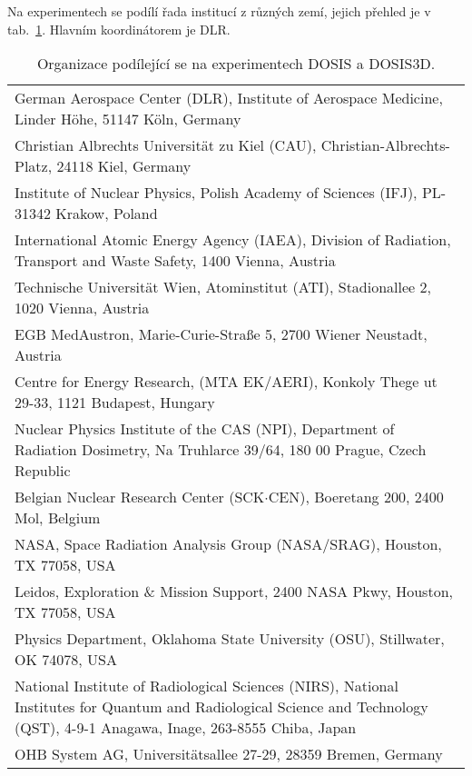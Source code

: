 Na experimentech se podílí řada institucí z různých zemí, jejich přehled je v tab.~\ref{tab:dosis_instituce}. Hlavním koordinátorem je DLR. 
\begin{table}[H]
  \centering
\renewcommand{\baselinestretch}{0.8}
\renewcommand{\arraystretch}{2}
\footnotesize
\caption{Organizace podílející se na experimentech DOSIS a DOSIS3D. \cite{dosis}}
  \label{tab:dosis_instituce}
  \begin{tabularx}{\textwidth}{X}
	\toprule
German Aerospace Center (DLR), Institute of Aerospace Medicine, Linder Höhe, 51147 Köln, Germany\\
Christian Albrechts Universität zu Kiel (CAU), Christian-Albrechts-Platz, 24118 Kiel, Germany                                    \\
Institute of Nuclear Physics, Polish Academy of Sciences (IFJ), PL-31342 Krakow, Poland                                          \\
International Atomic Energy Agency (IAEA), Division of Radiation, Transport and Waste Safety, 1400 Vienna, Austria               \\
Technische Universität Wien, Atominstitut (ATI), Stadionallee 2, 1020 Vienna, Austria                                            \\
EGB MedAustron, Marie-Curie-Straße 5, 2700 Wiener Neustadt, Austria                                                              \\
Centre for Energy Research, (MTA EK/AERI), Konkoly Thege ut 29-33, 1121 Budapest, Hungary                                             \\
Nuclear Physics Institute of the CAS (NPI), Department of Radiation Dosimetry, Na Truhlarce 39/64, 180 00 Prague, Czech Republic \\
Belgian Nuclear Research Center (SCK$\cdot$CEN), Boeretang 200, 2400 Mol, Belgium    \\
NASA, Space Radiation Analysis Group (NASA/SRAG), Houston, TX 77058, USA       \\
Leidos, Exploration \& Mission Support, 2400 NASA Pkwy, Houston, TX 77058, USA  \\
Physics Department, Oklahoma State University (OSU), Stillwater, OK 74078, USA \\
National Institute of Radiological Sciences (NIRS), National Institutes for Quantum and Radiological Science and Technology (QST), 4-9-1 Anagawa, Inage, 263-8555 Chiba, Japan\\
OHB System AG, Universitätsallee 27-29, 28359 Bremen, Germany\\
\bottomrule
  \end{tabularx}
\end{table}

